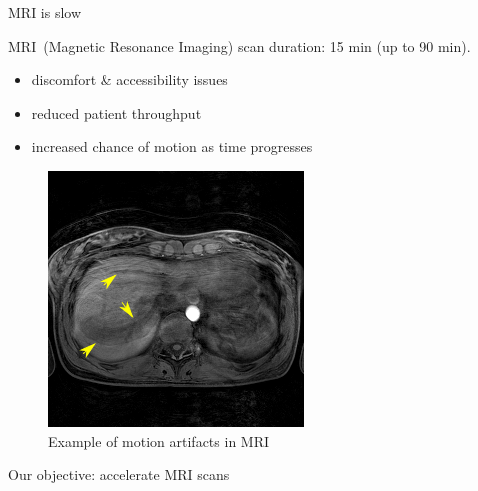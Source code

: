 \documentclass[aspectratio=169,xcolor=dvipsnames]{beamer}
\begin{document}
\begin{frame}{MRI is slow}
    \begin{multicols}{2}
        MRI~(Magnetic Resonance Imaging) scan duration: 15 min (up to 90 min).
    \begin{itemize}
        \item discomfort \& accessibility issues
        \item reduced patient throughput
        \item increased chance of motion as time progresses
    \end{itemize}
    \newpage
    \begin{figure}
        \centering
        \includegraphics[height=0.5\textheight]{Figures/intro_figures/motion_mri.png}
        \caption{Example of motion artifacts in MRI}
    \end{figure}
    \end{multicols}

\end{frame}

\begin{frame}{Our objective: accelerate MRI scans}
    \setlength{\parskip}{1ex}
    \begin{multicols}{2}
    \tableofcontents
    \end{multicols}
\end{frame}




\end{document}
